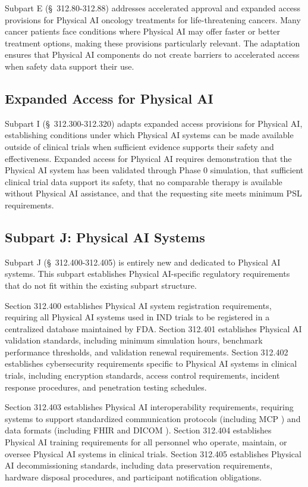 Subpart E (\S~312.80-312.88) addresses accelerated approval and expanded access
provisions for Physical AI oncology treatments for life-threatening cancers.
Many cancer patients face conditions where Physical AI may offer faster or
better treatment options, making these provisions particularly relevant. The
adaptation ensures that Physical AI components do not create barriers to
accelerated access when safety data support their use.

\subsection{Expanded Access for Physical AI}
\label{subsec:cfr312-expanded-access}

Subpart I (\S~312.300-312.320) adapts expanded access provisions for Physical
AI, establishing conditions under which Physical AI systems can be made
available outside of clinical trials when sufficient evidence supports their
safety and effectiveness. Expanded access for Physical AI requires
demonstration that the Physical AI system has been validated through Phase 0
simulation, that sufficient clinical trial data support its safety, that no
comparable therapy is available without Physical AI assistance, and that the
requesting site meets minimum PSL requirements.

\subsection{Subpart J: Physical AI Systems}
\label{subsec:cfr312-subpart-j}

Subpart J (\S~312.400-312.405) is entirely new and dedicated to Physical AI
systems. This subpart establishes Physical AI-specific regulatory requirements
that do not fit within the existing subpart structure.

Section 312.400 establishes Physical AI system registration requirements,
requiring all Physical AI systems used in IND trials to be registered in a
centralized database maintained by FDA. Section 312.401 establishes Physical AI
validation standards, including minimum simulation hours, benchmark performance
thresholds, and validation renewal requirements. Section 312.402 establishes
cybersecurity requirements specific to Physical AI systems in clinical trials,
including encryption standards, access control requirements, incident response
procedures, and penetration testing schedules.

Section 312.403 establishes Physical AI interoperability requirements, requiring
systems to support standardized communication protocols (including MCP
\cite{mcp-protocol}) and data formats (including FHIR \cite{hl7-fhir} and
DICOM \cite{dicom}). Section 312.404 establishes Physical AI training
requirements for all personnel who operate, maintain, or oversee Physical AI
systems in clinical trials. Section 312.405 establishes Physical AI
decommissioning standards, including data preservation requirements, hardware
disposal procedures, and participant notification obligations.

